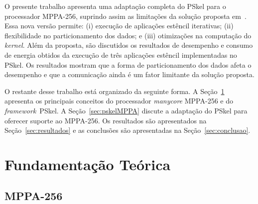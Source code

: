 \documentclass[12pt]{article}
\newcommand{\fw}{\textit{framework}\xspace}
\newcommand{\pskel}{\small \textsf{PSkel}\xspace}
\newcommand{\mppa}{\small \textsf{MPPA-256}\xspace}
\begin{document}
O presente trabalho apresenta uma adaptação completa do \pskel para o
processador \mppa, suprindo assim as limitações da solução proposta
em~\cite{Castro-Podesta-ERAD:2016}. Essa nova versão permite: (i) execução de
aplicações estêncil iterativas; (ii) flexibilidade no particionamento dos dados;
e (iii) otimizações na computação do \textit{kernel}. Além da proposta, são
discutidos os resultados de desempenho e consumo de energia obtidos da execução
de três aplicações estêncil implementadas no \pskel. Os resultados mostram que a
forma de particionamento dos dados afeta o desempenho e que a comunicação ainda
é um fator limitante da solução proposta.

O restante desse trabalho está organizado da seguinte forma. A
Seção~\ref{sec:fundamentacao} apresenta
os principais conceitos do processador \textit{manycore} \mppa e do \fw \
\pskel.
A Seção~\ref{sec:pskelMPPA} discute a adaptação do \pskel para oferecer suporte
ao \mppa.
Os resultados são apresentados na Seção~\ref{sec:resultados} e as conclusões são
apresentadas na Seção~\ref{sec:conclusao}.


\section{Fundamentação Teórica}
\label{sec:fundamentacao}



\subsection{MPPA-256}
\label{subsec:mppa}
\end{document}
